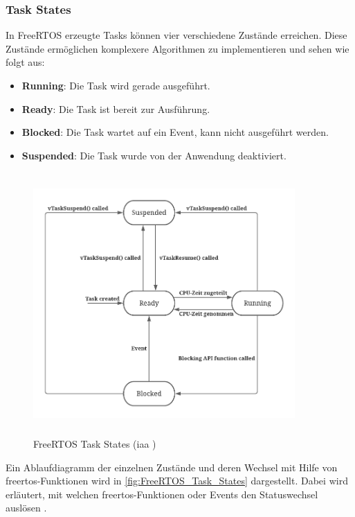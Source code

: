 \documentclass[../EDF Master Thesis.tex]{subfiles}
\begin{document}
\clearpage

\subsubsection{Task States} \label{section:task_states}
In FreeRTOS erzeugte Tasks können vier verschiedene Zustände erreichen.
Diese Zustände ermöglichen komplexere Algorithmen zu implementieren und sehen wie folgt aus:

\begin{itemize}
    \item \textbf{Running}: Die Task wird gerade ausgeführt.
    \item \textbf{Ready}: Die Task ist bereit zur Ausführung.
    \item \textbf{Blocked}: Die Task wartet auf ein Event, kann nicht ausgeführt werden.
    \item \textbf{Suspended}: Die Task wurde von der Anwendung deaktiviert.
\end{itemize}
\begin{center}
    \parencite{freertos-task-states}
\end{center}

\begin{figure}[H]
    \centering
    \includegraphics[height=10cm, width=10cm]{./attachments/FreeRTOS_Task_States.pdf}
    \caption[FreeRTOS Task States]{FreeRTOS Task States (\ac{iaa} \cite{freertos-task-states})}
    \label{fig:FreeRTOS_Task_States}
\end{figure}

Ein Ablaufdiagramm der einzelnen Zustände und deren Wechsel mit Hilfe von \ac{freertos}-Funktionen wird in \autoref{fig:FreeRTOS_Task_States} dargestellt.
Dabei wird erläutert, mit welchen \ac{freertos}-Funktionen oder Events den Statuswechsel auslösen \autocite{freertos-task-states}.
\end{document}
